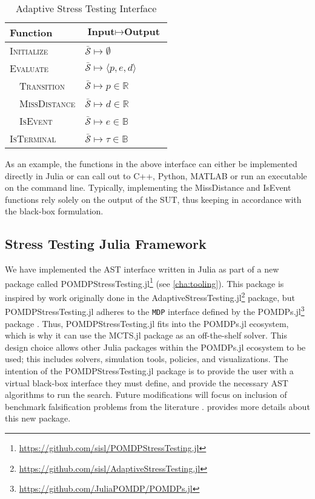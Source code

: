 \begin{table}[!h]
  \small
  \centering
  \caption{\label{tab:interface} Adaptive Stress Testing Interface}
  \begin{threeparttable}
  \begin{tabular}{@{}p{6cm}l@{}} %
    \toprule
    \textbf{Function} & \textbf{$\bm{\text{Input}\mapsto\text{Output}}$} \\
    \midrule
    \textsc{Initialize} & $\bar{\mathcal{S}} \mapsto \emptyset$ \\
    \textsc{Evaluate} & $\bar{\mathcal{S}} \mapsto \langle p, e, d \rangle$ \\
    $\quad$\textsc{Transition} & $\bar{\mathcal{S}} \mapsto p \in \mathbb{R}$ \\
    $\quad$\textsc{MissDistance} & $\bar{\mathcal{S}} \mapsto d \in \mathbb{R}$ \\
    $\quad$\textsc{IsEvent} & $\bar{\mathcal{S}} \mapsto e \in \mathbb{B}$ \\
    \textsc{IsTerminal} & $\bar{\mathcal{S}} \mapsto \tau \in \mathbb{B}$ \\
    \bottomrule
  \end{tabular}
  \end{threeparttable}
\end{table}


As an example, the functions in the above interface can either be implemented directly in Julia or can call out to C++, Python, MATLAB\textsuperscript{\textregistered} or run an executable on the command line. Typically, implementing the {\sc MissDistance} and {\sc IsEvent} functions rely solely on the output of the SUT, thus keeping in accordance with the black-box formulation.

\subsection{Stress Testing Julia Framework}
We have implemented the AST interface written in Julia as part of a new package called POMDPStressTesting.jl\footnote{\url{https://github.com/sisl/POMDPStressTesting.jl}} (see \cref{cha:tooling}).
This package is inspired by work originally done in the AdaptiveStressTesting.jl\footnote{\url{https://github.com/sisl/AdaptiveStressTesting.jl}} package, but POMDPStressTesting.jl adheres to the \texttt{MDP} interface defined by the POMDPs.jl\footnote{\url{https://github.com/JuliaPOMDP/POMDPs.jl}} package  \cite{pomdps_jl}.
Thus, POMDPStressTesting.jl fits into the POMDPs.jl ecosystem, which is why it can use the MCTS.jl package as an off-the-shelf solver.
This design choice allows other Julia packages within the POMDPs.jl ecosystem to be used; this includes solvers, simulation tools, policies, and visualizations.
The intention of the POMDPStressTesting.jl package is to provide the user with a virtual black-box interface they must define, and provide the necessary AST algorithms to run the search. Future modifications will focus on inclusion of benchmark falsification problems from the literature \cite{ernst2019arch}.  provides more details about this new package.


